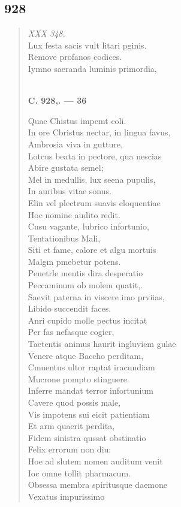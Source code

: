 \documentclass[11pt, a4paper]{report}
\begin{document}
            \subsection*{928}
      \begin{verse}
      \textit{XXX 348.} \\ Lux festa sacis vult litari pginis. \\ Remove profanos codices. \\ Iymno saeranda luminis primordia, \\ 
        ﻿\pagebreak 
     \marginpar{[350]} \begin{center} \textbf{C. 928,. — 36} \end{center}Quae Chistus impemt coli. \\ In ore Cbristus nectar, in lingua favus, \\ Ambrosia viva in gutture, \\ Lotcus beata in pectore, qua nescias \\ Abire gustata semel; \\ Mel in medullis, lux seena pupulis, \\ In auribus vitae sonus. \\ Elin vel plectrum suavis eloquentiae \\ Hoc nomine audito redit. \\ Cusu vagante, lubrico infortunio, \\ Tentationibus Mali, \\ Siti et fame, calore et algu mortuis \\ Malgm pmebetur potens. \\ Penetrle mentis dira desperatio \\ Peccaminum ob molem quatit,. \\ Saevit paterna in viscere imo prviias, \\ Libido succendit faces. \\ Anri cupido molle pectus incitat \\ Per fas nefasque cogier, \\ Taetentis animus haurit ingluviem gulae \\ Venere atque Baccho perditam, \\ Cmuentus ultor raptat iracundiam \\ Mucrone pompto stinguere. \\ Inferre mandat terror infortunium \\ Cavere quod possis male, \\ Vis impotens sui eicit patientiam \\ Et arm quaerit perdita, \\ Fidem sinistra qussat obstinatio \\ Felix errorum non diu: \\ Hoe ad slutem nomen auditum venit \\ Ioc omne tollit pharmacum. \\ Obsessa membra spiritusque daemone \\ Vexatus impurissimo \\ 

\end{verse}
\end{document}

